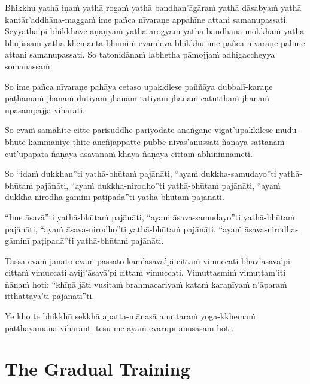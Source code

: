 \suttaRef{[MN 107]}

Bhikkhu yathā iṇaṁ yathā rogaṁ yathā bandhan'āgāraṁ yathā dāsabyaṁ yathā kantār'addhāna-maggaṁ ime pañca nīvaraṇe appahīne attani samanupassati. Seyyathā'pi bhikkhave āṇaṇyaṁ yathā ārogyaṁ yathā bandhanā-mokkhaṁ yathā bhujissaṁ yathā khemanta-bhūmiṁ evam'eva bhikkhu ime pañca nīvaraṇe pahīne attani samanupassati. So tatonidānaṁ labhetha pāmojjaṁ adhigaccheyya somanassaṁ.

So ime pañca nīvaraṇe pahāya cetaso upakkilese paññāya dubbalī-karaṇe paṭhamaṁ jhānaṁ dutiyaṁ jhānaṁ tatiyaṁ jhānaṁ catutthaṁ jhānaṁ upasampajja viharati.

So evaṁ samāhite citte parisuddhe pariyodāte anaṅgaṇe vigat'ūpakkilese mudu-bhūte kammaniye ṭhite āneñjappatte pubbe-nivās'ānussati-ñāṇāya sattānaṁ cut'ūpapāta-ñāṇāya āsavānaṁ khaya-ñāṇāya cittaṁ abhininnāmeti.

So ``idaṁ dukkhan''ti yathā-bhūtaṁ pajānāti, ``ayaṁ dukkha-samudayo''ti yathā-bhūtaṁ pajānāti, ``ayaṁ dukkha-nirodho''ti yathā-bhūtaṁ pajānāti, ``ayaṁ dukkha-nirodha-gāminī paṭipadā''ti yathā-bhūtaṁ pajānāti.

``Ime āsavā''ti yathā-bhūtaṁ pajānāti, ``ayaṁ āsava-samudayo''ti yathā-bhūtaṁ pajānāti, ``ayaṁ āsava-nirodho''ti yathā-bhūtaṁ pajānāti, ``ayaṁ āsava-nirodha-gāminī paṭipadā''ti yathā-bhūtaṁ pajānāti.

Tassa evaṁ jānato evaṁ passato kām'āsavā'pi cittaṁ vimuccati bhav'āsavā'pi cittaṁ vimuccati avijj'āsavā'pi cittaṁ vimuccati. Vimuttasmiṁ vimuttam'iti ñāṇaṁ hoti: ``khīṇā jāti vusitaṁ brahmacariyaṁ kataṁ karaṇīyaṁ n'āparaṁ itthattāyā'ti pajānātī''ti.

\suttaRef{[MN 39]}

Ye kho te bhikkhū sekkhā apatta-mānasā anuttaraṁ yoga-kkhemaṁ patthayamānā viharanti tesu me ayaṁ evarūpī anusāsanī hoti.

\suttaRef{[MN 107]}



\section{The Gradual Training}
\label{gradual-training}

